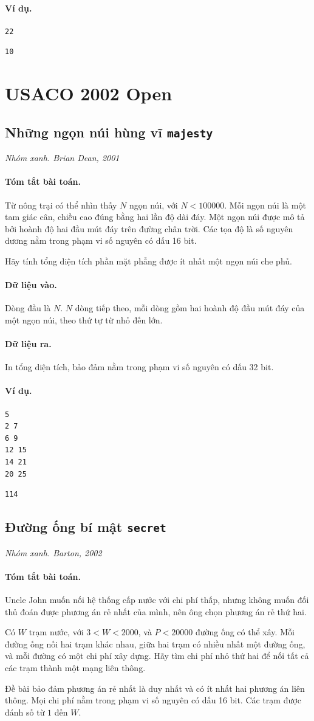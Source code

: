 \documentclass[11pt]{article}
\newcommand{\problem}[4]{%
  \subsection[#1 (#2)]{#1 \hfill {\normalsize\texttt{#2}}}%
  \noindent\textit{#3. #4}\par\smallskip
}
\newcommand{\iosec}[1]{\paragraph{#1}}
\begin{document}
\iosec{Ví dụ.}
\begin{verbatim}
22
\end{verbatim}

\begin{verbatim}
10
\end{verbatim}

\section{USACO 2002 Open}

\problem{Những ngọn núi hùng vĩ}{majesty}{Nhóm xanh}{Brian Dean, 2001}

\iosec{Tóm tắt bài toán.}
Từ nông trại có thể nhìn thấy \(N\) ngọn núi, với \(N<100000\). Mỗi ngọn núi
là một tam giác cân, chiều cao đúng bằng hai lần độ dài đáy. Một ngọn núi được
mô tả bởi hoành độ hai đầu mút đáy trên đường chân trời. Các tọa độ là số
nguyên dương nằm trong phạm vi số nguyên có dấu 16 bit.

Hãy tính tổng diện tích phần mặt phẳng được ít nhất một ngọn núi che phủ.

\iosec{Dữ liệu vào.}
Dòng đầu là \(N\). \(N\) dòng tiếp theo, mỗi dòng gồm hai hoành độ đầu mút đáy
của một ngọn núi, theo thứ tự từ nhỏ đến lớn.

\iosec{Dữ liệu ra.}
In tổng diện tích, bảo đảm nằm trong phạm vi số nguyên có dấu 32 bit.

\iosec{Ví dụ.}
\begin{verbatim}
5
2 7
6 9
12 15
14 21
20 25
\end{verbatim}

\begin{verbatim}
114
\end{verbatim}

\problem{Đường ống bí mật}{secret}{Nhóm xanh}{Barton, 2002}

\iosec{Tóm tắt bài toán.}
Uncle John muốn nối hệ thống cấp nước với chi phí thấp, nhưng không muốn đối
thủ đoán được phương án rẻ nhất của mình, nên ông chọn phương án rẻ thứ hai.

Có \(W\) trạm nước, với \(3<W<2000\), và \(P<20000\) đường ống có thể xây.
Mỗi đường ống nối hai trạm khác nhau, giữa hai trạm có nhiều nhất một đường
ống, và mỗi đường có một chi phí xây dựng. Hãy tìm chi phí nhỏ thứ hai để nối
tất cả các trạm thành một mạng liên thông.

Đề bài bảo đảm phương án rẻ nhất là duy nhất và có ít nhất hai phương án liên
thông. Mọi chi phí nằm trong phạm vi số nguyên có dấu 16 bit. Các trạm được
đánh số từ \(1\) đến \(W\).
\end{document}
